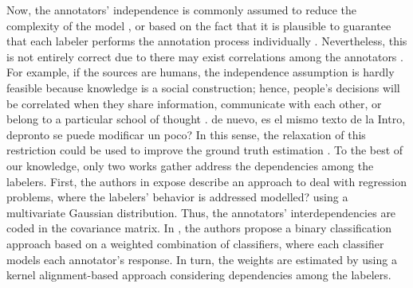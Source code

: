 \documentclass[journal]{IEEEtran}
\newcommand{\comment}[2]{{\color{blue}#1} {\color{red}#2}}
\begin{document}
Now, the annotators' independence is commonly assumed to reduce the
complexity of the model \cite{venanzi2014community}, or based on the
fact that it is plausible to guarantee that each labeler performs the
annotation process individually
\cite{tang2019leveraging}. Nevertheless, this is not entirely correct
due to there may exist correlations among the annotators
\cite{zhang2011learning}. \comment{For example, if the sources are
  humans, the independence assumption is hardly feasible because
  knowledge is a social construction; hence, people's decisions will
  be correlated when they share information, communicate with each
  other, or belong to a particular school of thought
  \cite{surowiecki2005wisdom,hahn2018communication}.}{de nuevo, es el
  mismo texto de la Intro, depronto se puede modificar un poco?} In
this sense, the relaxation of this restriction could be used to
improve the ground truth estimation \cite{g2019machine}. To the best
of our knowledge, only two works \comment{gather}{address} the dependencies among the
labelers. First, \comment{}{the} authors in \cite{zhu2019unsupervised} \comment{expose}{describe} an
approach to deal with regression problems, where the labelers'
behavior is \comment{addressed}{modelled?} using a multivariate Gaussian
distribution. Thus, the annotators' interdependencies are coded in the
covariance matrix.  In \cite{gil2018learning}, \comment{}{the} authors propose a
binary classification approach based on a weighted combination of
classifiers, where each classifier models each annotator's
response. In turn, the weights are estimated by using a kernel
alignment-based approach considering dependencies among the labelers.
\end{document}

